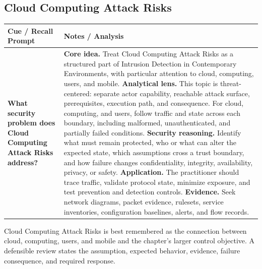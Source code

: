 \documentclass[11pt]{article}
\newcommand{\CornellHeader}{%
\rowcolor{Navy}\color{white}\bfseries Cue / Recall Prompt & \color{white}\bfseries Notes / Analysis\\\hline}
\newcommand{\CornellRow}[2]{%
\cellcolor{CueGray}\RaggedRight\textbf{#1} & \RaggedRight #2\\\hline}
\begin{document}
\subsection*{Cloud Computing Attack Risks}
\begin{longtable}{>{\RaggedRight\arraybackslash}p{}|>{\RaggedRight\arraybackslash}p{}}
\CornellHeader
\CornellRow{What security problem does Cloud Computing Attack Risks address?}{\textbf{Core idea.} Treat Cloud Computing Attack Risks as a structured part of Intrusion Detection in Contemporary Environments, with particular attention to cloud, computing, users, and mobile. \textbf{Analytical lens.} This topic is threat-centered: separate actor capability, reachable attack surface, prerequisites, execution path, and consequence. For cloud, computing, and users, follow traffic and state across each boundary, including malformed, unauthenticated, and partially failed conditions. \textbf{Security reasoning.} Identify what must remain protected, who or what can alter the expected state, which assumptions cross a trust boundary, and how failure changes confidentiality, integrity, availability, privacy, or safety. \textbf{Application.} The practitioner should trace traffic, validate protocol state, minimize exposure, and test prevention and detection controls. \textbf{Evidence.} Seek network diagrams, packet evidence, rulesets, service inventories, configuration baselines, alerts, and flow records.}
\end{longtable}
\begin{topicsummary}
Cloud Computing Attack Risks is best remembered as the connection between cloud, computing, users, and mobile and the chapter's larger control objective. A defensible review states the assumption, expected behavior, evidence, failure consequence, and required response.
\end{topicsummary}
\end{document}

